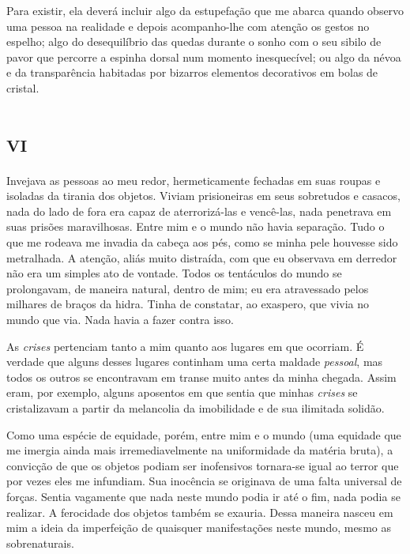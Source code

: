 Para existir, ela deverá incluir algo da estupefação que me abarca quando observo uma pessoa na realidade e depois acompanho-lhe com atenção os gestos no espelho; algo do desequilíbrio das quedas durante o sonho com o seu sibilo de pavor que percorre a espinha dorsal num momento inesquecível; ou algo da névoa e da transparência habitadas por bizarros elementos decorativos em bolas de cristal.


\chapter*{\huge\centering\textsc{vi}}

Invejava as pessoas ao meu redor, hermeticamente fechadas em suas roupas e isoladas da tirania dos objetos. Viviam prisioneiras em seus sobretudos e casacos, nada do lado de fora era capaz de aterrorizá-las e vencê-las, nada penetrava em suas prisões maravilhosas. Entre mim e o mundo não havia separação. Tudo o que me rodeava me invadia da cabeça aos pés, como se minha pele houvesse sido metralhada. A atenção, aliás muito distraída, com que eu observava em derredor não era um simples ato de vontade. Todos os tentáculos do mundo se prolongavam, de maneira natural, dentro de mim; eu era atravessado pelos milhares de braços da hidra. Tinha de constatar, ao exaspero, que vivia no mundo que via. Nada havia a fazer contra isso.

As \textit{crises} pertenciam tanto a mim quanto aos lugares em que ocorriam. É verdade que alguns desses lugares continham uma certa maldade \textit{pessoal}, mas todos os outros se encontravam em transe muito antes da minha chegada. Assim eram, por exemplo, alguns aposentos em que sentia que minhas \textit{crises} se cristalizavam a partir da melancolia da imobilidade e de sua ilimitada solidão.

Como uma espécie de equidade, porém, entre mim e o mundo (uma equidade que me imergia ainda mais irremediavelmente na uniformidade da matéria bruta), a convicção de que os objetos podiam ser inofensivos tornara-se igual ao terror que por vezes eles me infundiam. Sua inocência se originava de uma falta universal de forças.
Sentia vagamente que nada neste mundo podia ir até o fim, nada podia se realizar. A ferocidade dos objetos também se exauria. Dessa maneira nasceu em mim a ideia da imperfeição de quaisquer manifestações neste mundo, mesmo as sobrenaturais. 

